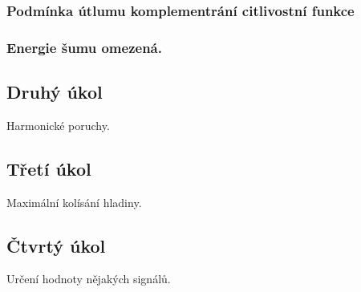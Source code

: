 \documentclass[a4paper,11pt]{article}
\begin{document}
\subsubsection{Podmínka útlumu komplementrání citlivostní funkce}
\subsubsection{Energie šumu omezená.}
\subsection{Druhý úkol}
Harmonické poruchy.
\subsection{Třetí úkol}
Maximální kolísání hladiny.
\subsection{Čtvrtý úkol}
Určení hodnoty nějakých signálů.
\end{document}
